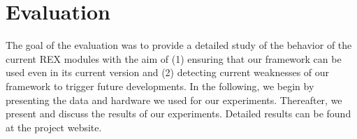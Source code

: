 



\section{Evaluation}
\label{sec:evaluation}
The goal of the evaluation was to provide a detailed study of the behavior of the current REX modules with the aim of (1) ensuring that our framework can be used even in its current version and (2) detecting current weaknesses of our framework to trigger future developments.
In the following, we begin by presenting the data and hardware we used for our experiments. 
Thereafter, we present and discuss the results of our experiments.
Detailed results can be found at the project website.

